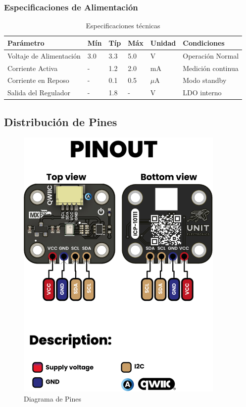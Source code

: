 \documentclass[11pt,a4paper]{article}
\begin{document}
\subsubsection{Especificaciones de Alimentación}


\begin{table}[H]
\centering
\small
\begin{tabular}{|l|l|l|l|l|l|}
\hline
Parámetro & Mín & Típ & Máx & Unidad & Condiciones \\
\hline
Voltaje de Alimentación & 3.0 & 3.3 & 5.0 & V & Operación Normal \\
Corriente Activa & - & 1.2 & 2.0 & mA & Medición continua \\
Corriente en Reposo & - & 0.1 & 0.5 & $\mu$A & Modo standby \\
Salida del Regulador & - & 1.8 & - & V & LDO interno \\
\hline
\end{tabular}
\caption{Especificaciones técnicas}
\end{table}


\subsection{Distribución de Pines}


\begin{figure}[H]
\centering
\includegraphics[width=0.9\textwidth]{es_unit_pinout_v_0_0_1_ue0094_icp10111_barometric_pressure_sensor_en.jpg}
\caption{Diagrama de Pines}
\label{fig:es-unit-pinout-v-0-0-1-ue0094-icp10111-barometric-pressure-sensor-en-jpg}
\end{figure}
\end{document}
